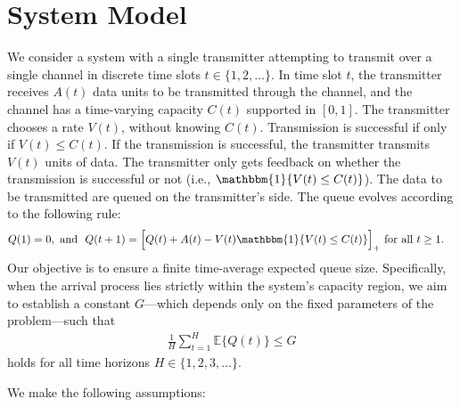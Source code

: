 \documentclass[12pt,draftcls, onecolumn]{IEEEtran}
\begin{document}
\section{System Model}\label{sec:sys_mod}
We consider a system with a single transmitter attempting to transmit over a single channel in discrete time slots $t \in \{1,2,\dots\}$. In time slot $t$, the transmitter receives $A(t)$ data units to be transmitted through the channel, and the channel has a time-varying capacity $C(t)$ supported in $[0,1]$. The transmitter chooses a rate $V(t)$, without knowing $C(t)$. Transmission is successful if only if $V(t) \leq C(t)$. If the transmission is successful, the transmitter transmits $V(t)$ units of data. The transmitter only gets feedback on whether the transmission is successful or not (i.e., $\mathbbm{1}\{V(t) \leq C(t)\}$). The data to be transmitted are queued on the transmitter's side. The queue evolves according to the following rule:
\begin{align}\label{eqn:basic_queeing equation}
    &Q(1) = 0, \text{ and } \ Q(t+1) = \Bigl[Q(t) + A(t) - V(t)\mathbbm{1}\{V(t) \leq C(t)\}\Bigr]_+ \text{ for all } t\geq 1. 
\end{align}
Our objective is to ensure a finite time-average expected queue size. Specifically, when the arrival process lies strictly within the system's capacity region, we aim to establish a constant \(G\)—which depends only on the fixed parameters of the problem—such that
\begin{align}\label{eqn:Main_goal}
    \frac{1}{H} \sum_{t=1}^H \mathbb{E}\{Q(t)\} \leq G
\end{align}
holds for all time horizons \(H \in \{1,2,3,\dots\}\).

We make the following assumptions:
\end{document}
